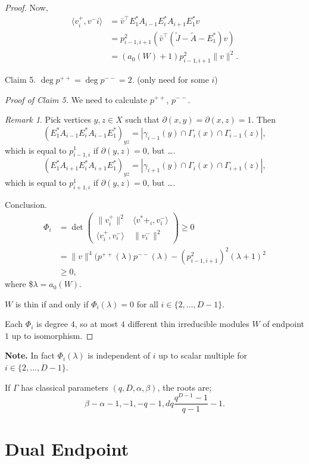 \documentclass[
]{book}
\theoremstyle{definition}
\theoremstyle{definition}
\theoremstyle{definition}
\theoremstyle{definition}
\theoremstyle{remark}
\newtheorem*{remark}{Remark}
\begin{document}
\begin{proof}
Now,
\begin{align}
\langle v^+_i, v^-i\rangle & = \bar{v}^\top E^*_1A_{i-1}E^*_iA_{i+1}E^*_1v\\
& = p^2_{i-1,i+1}(\bar{v}^\top (\tilde{J}-\tilde{A}-E^*_1)v)\\
& = (a_0(W)+1)p^2_{i-1,i+1}\|v\|^2.
\end{align}

Claim 5. \(\deg p^{++} = \deg p^{--} = 2\). (only need for some \(i\))

\emph{Proof of Claim 5.}
We need to calculate \(p^{++}\), \(p^{--}\).

\begin{remark}
Pick vertices \(y,z\in X\) such that \(\partial(x,y) = \partial(x,z) =1\). Then
\[(E^*_1A_{i-1}E^*_iA_{i-1}E^*_1)_{yz} = |\gamma_{i-1}(y)\cap \Gamma_i(x)\cap \Gamma_{i-1}(z)|,\]
which is equal to \(p^{1}_{i-1,i}\) if \(\partial(y,z)=0\), but \ldots.
\[(E^*_1A_{i+1}E^*_iA_{i+1}E^*_1)_{yz} = |\gamma_{i+1}(y)\cap \Gamma_i(x)\cap \Gamma_{i+1}(z)|,\]
which is equal to \(p^{1}_{i+1,i}\) if \(\partial(y,z)=0\), but \ldots.
\end{remark}

Conclusion.
\begin{align}
\Phi_i & = \det \begin{pmatrix}\|v^+_i\|^2 & \langle v^*+_i, v^-_i\rangle\\
\langle v^+_i,v^-_i\rangle & \|v^-_i\|^2 \end{pmatrix} \geq 0\\
& = \|v\|^4(p^{++}(\lambda)p^{--}(\lambda) - (p^2_{i-1,i+1})^2(\lambda+1)^2\\
& \geq 0,
\end{align}
where \$\(\lambda = a_0(W)\).

\(W\) is thin if and only if \(\Phi_i(\lambda) = 0\) for all \(i\in \{2, \ldots, D-1\}\).

Each \(\Phi_i\) is degree \(4\), so at most \(4\) different thin irreducible modules \(W\) of endpoint \(1\) up to isomorphism.

\end{proof}

\textbf{Note.}
In fact \(\Phi_i(\lambda)\) is independent of \(i\) up to scalar multiple for \(i\in \{2,\ldots, D-1\}\).

If \(\Gamma\) has classical parameters \((q,D, \alpha, \beta)\), the roots are;
\[\beta-\alpha-1, -1, -q-1, dq\frac{q^{D-1}-1}{q-1}-1.\]

\hypertarget{lec36}{%
\chapter{Dual Endpoint}\label{lec36}}
\end{document}
